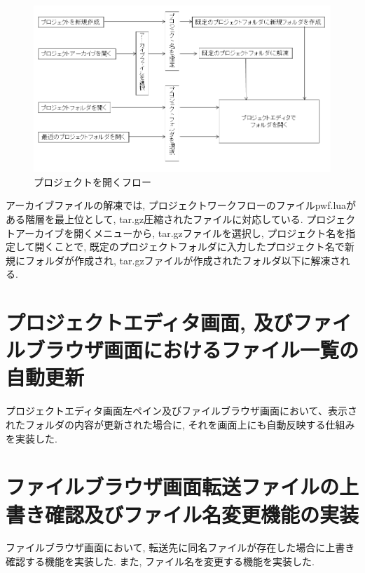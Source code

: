 \documentclass[a4paper,10pt,oneside]{jsbook}
\begin{document}
\begin{figure}[htbp]
	\begin{center}
		\includegraphics[width=12.0cm]{image/projectopenflow.png}
	\end{center}
	\caption{プロジェクトを開くフロー}
	\label{fig:projectopenflow}
\end{figure}

アーカイブファイルの解凍では, プロジェクトワークフローのファイルpwf.luaがある階層を最上位として, tar.gz圧縮されたファイルに対応している. プロジェクトアーカイブを開くメニューから, tar.gzファイルを選択し, プロジェクト名を指定して開くことで, 既定のプロジェクトフォルダに入力したプロジェクト名で新規にフォルダが作成され, tar.gzファイルが作成されたフォルダ以下に解凍される.

\section{プロジェクトエディタ画面, 及びファイルブラウザ画面におけるファイル一覧の自動更新}
プロジェクトエディタ画面左ペイン及びファイルブラウザ画面において、表示されたフォルダの内容が更新された場合に, それを画面上にも自動反映する仕組みを実装した.

\section{ファイルブラウザ画面転送ファイルの上書き確認及びファイル名変更機能の実装}
ファイルブラウザ画面において, 転送先に同名ファイルが存在した場合に上書き確認する機能を実装した. また, ファイル名を変更する機能を実装した. 
\end{document}
